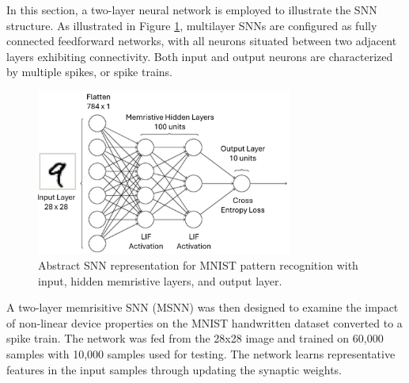 
In this section, a two-layer neural network is employed to illustrate the SNN structure. As illustrated in Figure \ref{fig:6i}, multilayer SNNs are configured as fully connected feedforward networks, with all neurons situated between two adjacent layers exhibiting connectivity. Both input and output neurons are characterized by multiple spikes, or spike trains.\\
\begin{figure}[htbp!] 
    \centering    
    \includegraphics[width=0.75\textwidth]{Chapter6/Figs/i.png}
    \caption[Abstract SNN representation for MNIST pattern recognition with input, hidden memristive layers, and output layer.]{Abstract SNN representation for MNIST pattern recognition with input, hidden memristive
    layers, and output layer.}
    \label{fig:6i}
\end{figure}

\noindent A two-layer memrisitive SNN (MSNN) was then designed to examine the impact of non-linear device properties on the MNIST handwritten dataset converted to a spike train.  The network was fed from the 28x28 image and trained on 60,000 samples with 10,000 samples used for testing. The network learns representative features in the input samples through updating the synaptic weights. \\


